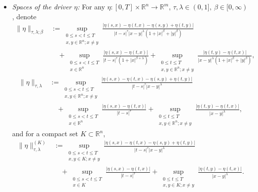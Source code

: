 \documentclass[11pt,reqno]{amsart}
\def\R{\mathbb R}
\numberwithin{equation}{section}
\begin{document}
\begin{itemize}
\item {\it Spaces of the driver $\eta
$:} 
For any $\eta:[0,T]\times\mathbb{R}^{n}\rightarrow\mathbb{R}^{m}$, $\tau, \lambda\in(0,1],\  \beta\in[0,\infty)$,  denote
\begin{equation}\label{e:norm1}
\begin{aligned}
\|\eta\|_{\tau,\lambda; \beta}&:=\sup _{\substack{0 \leq s<t \leq T \\ x, y \in \mathbb{R}^{n} ; x \neq y}} \frac{|\eta(s, x)-\eta(t, x)-\eta(s, y)+\eta(t, y)|}{|t-s|^{\tau}|x-y|^{\lambda}(1+|x|^{ \beta}+|y|^{ \beta})} \\ 
&\quad +\sup _{\substack{0 \leq s<t \leq T\\ x \in \mathbb{R}^{n}}} \frac{|\eta(s, x)-\eta(t, x)|}{|t-s|^{\tau}(1+|x|^{ \beta + \lambda})}+\sup _{\substack{0 \leq t \leq T \\ x, y \in \mathbb{R}^{n} ; x \neq y}} \frac{|\eta(t, y)-\eta(t, x)|}{|x-y|^{\lambda}(1+|x|^{ \beta}+|y|^{ \beta})} ,
\end{aligned}
\end{equation}
\begin{equation}\label{e:norm2}
\begin{aligned}
\|\eta\|_{\tau,\lambda}&:=\sup _{\substack{0 \leq s<t \leq T \\ x, y \in \mathbb{R}^{n} ; x \neq y}} \frac{|\eta(s, x)-\eta(t, x)-\eta(s, y)+\eta(t, y)|}{|t-s|^{\tau}|x-y|^{\lambda}} \\ 
&\quad +\sup _{\substack{0 \leq s<t \leq T \\ x \in \mathbb{R}^{n}}} \frac{|\eta(s, x)-\eta(t, x)|}{|t-s|^{\tau}}+\sup _{\substack{0 \leq t \leq T \\ x, y \in \mathbb{R}^{n} ; x \neq y}} \frac{|\eta(t, y)-\eta(t, x)|}{|x-y|^{\lambda}} ,
\end{aligned}
\end{equation}
and for a compact set $K\subset \R^{n}$, 
\begin{equation*}
\begin{aligned}
\|\eta\|^{(K)}_{\tau,\lambda} &:= \sup_{\substack{0 \leq s<t \leq T\\ x,y\in K; x \neq y}}\frac{|\eta(s,x) - \eta(t,x) - \eta(s,y) + \eta(t,y)|}{|t-s|^{\tau}|x-y|^{\lambda	}}\\
&\quad  + \sup_{\substack{0 \leq s<t \leq T\\ x\in K}}\frac{|\eta(s,x) - \eta(t,x)|}{|t-s|^{\tau}} + \sup_{\substack{0\le t\le T\\ x,y\in K; x \neq y}} \frac{|\eta(t,y) - \eta(t,x)|}{|x-y|^{\lambda}}.

\end{aligned}
\end{equation*}
\end{itemize}
\end{document}
